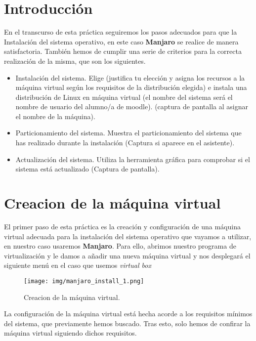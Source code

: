 \documentclass[12pt]{article}
\begin{document}
    \section*{Introducción}
      En el transcurso de esta práctica seguiremos los pasos adecuados para que la Instalación del sistema 
      operativo, en este caso \textbf{Manjaro} se realice de manera satisfactoria. También hemos de cumplir 
      una serie de criterios para la correcta realización de la misma, que son los siguientes.
      \begin{itemize}
        \item Instalación del sistema. Elige (justifica tu elección y asigna los recursos a la máquina virtual 
        según los requisitos de la distribución elegida) e instala una distribución de Linux en máquina virtual 
        (el nombre del sistema será el nombre de usuario del alumno/a de moodle). (captura de pantalla al asignar 
        el nombre de la máquina).
        \item Particionamiento del sistema. Muestra el particionamiento del sistema que has realizado durante la 
        instalación (Captura si aparece en el asistente).
        \item Actualización del sistema. Utiliza la herramienta gráfica para comprobar si el sistema está actualizado 
        (Captura de pantalla).
      \end{itemize}
      

      \newpage

      \section{Creacion de la máquina virtual}
      El primer paso de esta práctica es la creación y configuración de una máquina virtual adecuada para la instalación 
      del sistema operativo que vayamos a utilizar, en nuestro caso usaremos \textbf{Manjaro}. Para ello, abrimos 
      nuestro programa de virtualización y le damos a añadir una nueva máquina virtual y nos desplegará el siguiente menú
      en el caso que usemos \textit{virtual box}
      \begin{figure}[h]
        \centering
        \texttt{[image: img/manjaro\_install\_1.png]}
        \caption{Creacion de la máquina virtual.}
        \label{Manjaro1}
      \end{figure}

      La configuración de la máquina virtual está hecha acorde a los requisitos mínimos del sistema, que previamente hemos 
      buscado. Tras esto, solo hemos de confirar la máquina virtual siguiendo dichos requisitos.
\end{document}
